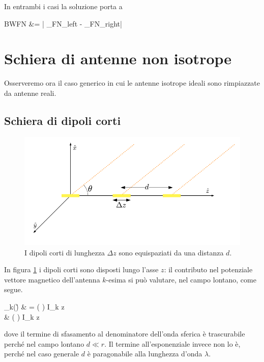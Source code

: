 In entrambi i casi la soluzione porta a
\begin{esp}
	BWFN &= \left| \theta_{FN_{left}} - \theta_{FN_{right}}\right| 
\end{esp}
\section{Schiera di antenne non isotrope}
	Osserveremo ora il caso generico in cui le antenne isotrope ideali sono rimpiazzate da antenne reali.

	\subsection{Schiera di dipoli corti}
		\begin{figure}[ht]
			\centering
			\includegraphics{img/schiera_non_isotropa_dipoli_corti.pdf}
			\caption{I dipoli corti di lunghezza $\Delta z$ sono equispaziati da una distanza $d$.}
			\label{fig:schiera_non_isotropa_dipoli_corti}
		\end{figure}

		In figura \ref{fig:schiera_non_isotropa_dipoli_corti} i dipoli corti sono disposti lungo l'asse $z$: il contributo nel potenziale vettore magnetico dell'antenna $k$-esima si può valutare, nel campo lontano, come segue.

		\begin{esp}
			_k(\r)
				& = \frac{\mu}{4\pi}
				\left(  \right)
				I_k \Delta z \,  \\
				& \simeq \frac{\mu}{4\pi}
				\left(  \right)
				I_k \Delta z \, 
		\end{esp}
		dove il termine di sfasamento al denominatore dell'onda sferica è trascurabile perché nel campo lontano $d \ll r$. Il termine all'esponenziale invece non lo è, perché nel caso generale $d$ è paragonabile alla lunghezza d'onda $\lambda$.

